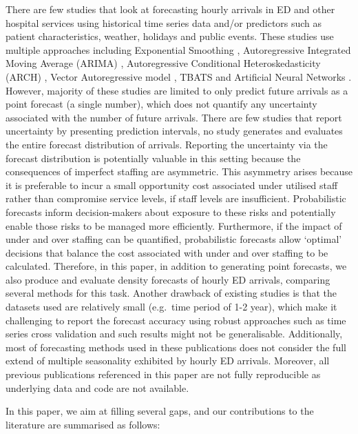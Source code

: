 \documentclass[]{elsarticle} %
\begin{document}
There are few studies that look at forecasting hourly arrivals in ED and other hospital services using historical time series data and/or predictors such as patient characteristics, weather, holidays and public events. These studies use multiple approaches including Exponential Smoothing \citep{SvetunkovAdam}, Autoregressive Integrated Moving Average (ARIMA) \citep{hyndman2021forecasting}, Autoregressive Conditional Heteroskedasticity (ARCH) \citep{bollerslev1994arch}, Vector Autoregressive model \citep{lutkepohl2013vector}, TBATS \citep{de2011forecasting} and Artificial Neural Networks \citep{hyndman2021forecasting}. However, majority of these studies are limited to only predict future arrivals as a point forecast (a single number), which does not quantify any uncertainty associated with the number of future arrivals. There are few studies that report uncertainty by presenting prediction intervals, no study generates and evaluates the entire forecast distribution of arrivals. Reporting the uncertainty via the forecast distribution is potentially valuable in this setting because the consequences of imperfect staffing are asymmetric. This asymmetry arises because it is preferable to incur a small opportunity cost associated under utilised staff rather than compromise service levels, if staff levels are insufficient. Probabilistic forecasts inform decision-makers about exposure to these risks and potentially enable those risks to be managed more efficiently. Furthermore, if the impact of under and over staffing can be quantified, probabilistic forecasts allow `optimal' decisions that balance the cost associated with under and over staffing to be calculated. Therefore, in this paper, in addition to generating point forecasts, we also produce and evaluate density forecasts of hourly ED arrivals, comparing several methods for this task. Another drawback of existing studies is that the datasets used are relatively small (e.g.~time period of 1-2 year), which make it challenging to report the forecast accuracy using robust approaches such as time series cross validation and such results might not be generalisable. Additionally, most of forecasting methods used in these publications does not consider the full extend of multiple seasonality exhibited by hourly ED arrivals. Moreover, all previous publications referenced in this paper are not fully reproducible as underlying data and code are not available.

In this paper, we aim at filling several gaps, and our contributions to the literature are summarised as follows:
\end{document}
